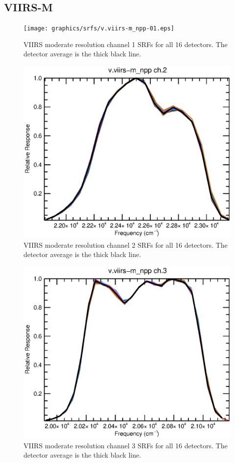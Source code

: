 \subsection{VIIRS-M}
\begin{figure}[H]
  \centering
  \texttt{[image: graphics/srfs/v.viirs-m\_npp-01.eps]}
  \caption{VIIRS moderate resolution channel 1 SRFs for all 16 detectors. The detector average is the thick black line.}
  \label{fig:v.viirs-m_npp-01}
\end{figure}
\begin{figure}[H]
  \centering
  \includegraphics[bb= 0 15 400 330,clip,scale=0.8]{graphics/srfs/v.viirs-m_npp-02.eps}
  \caption{VIIRS moderate resolution channel 2 SRFs for all 16 detectors. The detector average is the thick black line.}
  \label{fig:v.viirs-m_npp-02}
\end{figure}
\begin{figure}[H]
  \centering
  \includegraphics[bb= 0 15 400 330,clip,scale=0.8]{graphics/srfs/v.viirs-m_npp-03.eps}
  \caption{VIIRS moderate resolution channel 3 SRFs for all 16 detectors. The detector average is the thick black line.}
  \label{fig:v.viirs-m_npp-03}
\end{figure}
